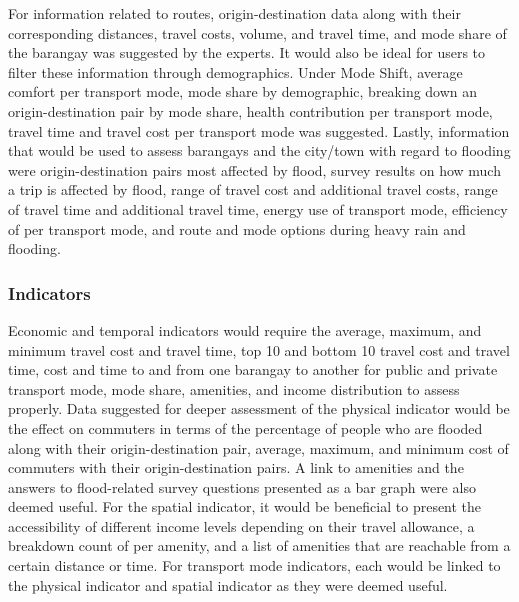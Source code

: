 \documentclass{sigchi}
\begin{document}
For information related to routes, origin-destination data along with their corresponding distances, travel costs, volume, and travel time, and mode share of the barangay was suggested by the experts. It would also be ideal for users to filter these information through demographics. Under Mode Shift, average comfort per transport mode, mode share by demographic, breaking down an origin-destination pair by mode share, health contribution per transport mode, travel time and travel cost per transport mode was suggested. Lastly, information that would be used to assess barangays and the city/town with regard to flooding were origin-destination pairs most affected by flood, survey results on how much a trip is affected by flood, range of travel cost and additional travel costs, range of travel time and additional travel time, energy use of transport mode, efficiency of per transport mode, and route and mode options during heavy rain and flooding. 

\subsubsection{Indicators}
Economic and temporal indicators would require the average, maximum, and minimum travel cost and travel time, top 10 and bottom 10 travel cost and travel time, cost and time to and from one barangay to another for public and private transport mode, mode share, amenities, and income distribution to assess properly. Data suggested for deeper assessment of the physical indicator would be the effect on commuters in terms of the percentage of people who are flooded along with their origin-destination pair, average, maximum, and minimum cost of commuters with their origin-destination pairs. A link to amenities and the answers to flood-related survey questions presented as a bar graph were also deemed useful. For the spatial indicator, it would be beneficial to present the accessibility of different income levels depending on their travel allowance, a breakdown count of per amenity, and a list of amenities that are reachable from a certain distance or time. For transport mode indicators, each would be linked to the physical indicator and spatial indicator as they were deemed useful.
\end{document}
